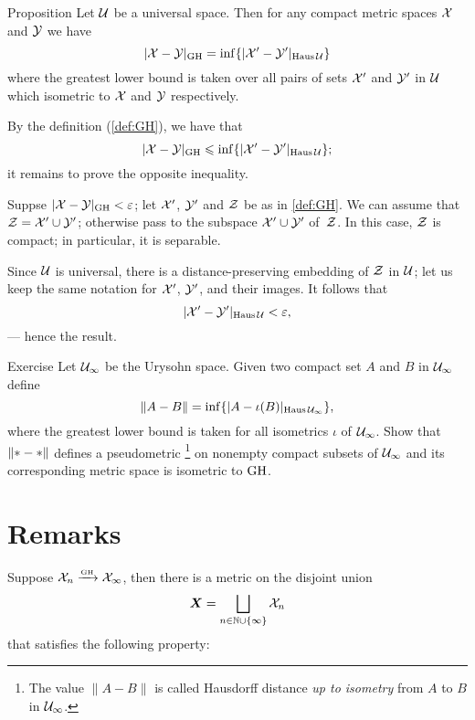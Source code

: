 \begin{thm}{Proposition}\label{prop:GH-with-fixed-Z}
Let $\mathcal{U}$ be a universal space.
Then for any compact metric spaces $\mathcal{X}$ and $\mathcal{Y}$ we have
$$|\mathcal{X}-\mathcal{Y}|_{\operatorname{\rm GH}\nolimits} = \inf \{|\mathcal{X}'-\mathcal{Y}'|_{\operatorname{\rm Haus}\nolimits\mathcal{U}}\}$$ 
where the greatest lower bound is taken over all pairs of sets $\mathcal{X}'$ and $\mathcal{Y}'$ in $\mathcal{U}$
which isometric to  $\mathcal{X}$ and $\mathcal{Y}$ respectively.  
\end{thm}




By the definition (\ref{def:GH}), we have that 
\[|\mathcal{X}-\mathcal{Y}|_{\operatorname{\rm GH}\nolimits} \leqslant \inf \{|\mathcal{X}'-\mathcal{Y}'|_{\operatorname{\rm Haus}\nolimits\mathcal{U}}\};\]
it remains to prove the opposite inequality.

Suppse $|\mathcal{X}-\mathcal{Y}|_{\operatorname{\rm GH}\nolimits}<\varepsilon$;
let $\mathcal{X}'$, $\mathcal{Y}'$ and $\mathcal{Z}$ be as in \ref{def:GH}.
We can assume that $\mathcal{Z}=\mathcal{X}'\cup\mathcal{Y}'$;
otherwise pass to the subspace $\mathcal{X}'\cup\mathcal{Y}'$ of~$\mathcal{Z}$.
In this case, $\mathcal{Z}$ is compact;
in particular, it is separable.

Since $\mathcal{U}$ is universal, there is a distance-preserving embedding of $\mathcal{Z}$ in $\mathcal{U}$;
let us keep the same notation for $\mathcal{X}'$, $\mathcal{Y}'$, and their images.
It follows that 
\[|\mathcal{X}'-\mathcal{Y}'|_{\operatorname{\rm Haus}\nolimits\mathcal{U}}<\varepsilon,\]
--- hence the result.
\qeds

\begin{thm}{Exercise}\label{ex:GH-urysohn}
Let $\mathcal{U}_\infty$ be the Urysohn space.
Given two compact set $A$ and $B$ in $\mathcal{U}_\infty$ define 
\[\|A-B\|=\inf\{|A-\iota(B)|_{\operatorname{\rm Haus}\nolimits\mathcal{U}_\infty}\},\]
where the greatest lower bound is taken for all isometrics $\iota$ of $\mathcal{U}_\infty$.
Show that $\|{*}\z-{*}\|$ defines a pseudometric%
\footnote{The value $\|A-B\|$ is called Hausdorff distance \emph{up to isometry} from $A$ to $B$ in $\mathcal{U}_\infty$.}
on nonempty compact subsets of $\mathcal{U}_\infty$ and its corresponding metric space is isometric to $\operatorname{\rm GH}\nolimits$.
\end{thm}

\section{Remarks}

Suppose $\mathcal{X}_n\xrightarrow{\mbox{\tiny\rm GH}} \mathcal{X}_\infty$, then there is a metric on the disjoint union 
\[\bm{X}=\bigsqcup_{n\in \mathbb{N}\cup\{\infty\}} \mathcal{X}_n\] 
that satisfies the following property:

